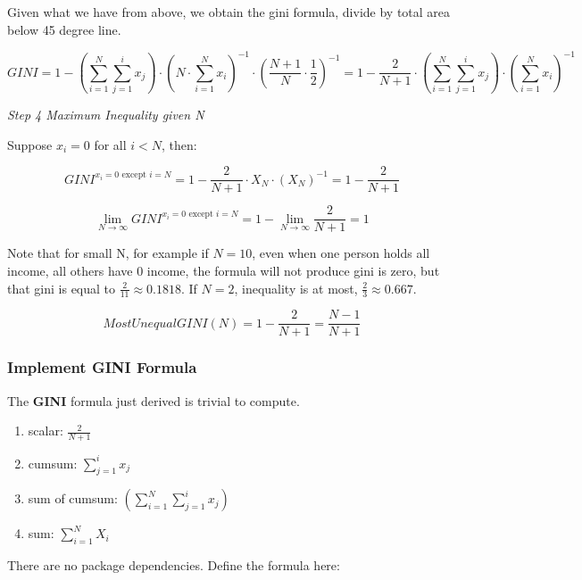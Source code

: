 \documentclass[
]{book}
\providecommand{\tightlist}{%
  \setlength{\itemsep}{0pt}\setlength{\parskip}{0pt}}
\begin{document}
Given what we have from above, we obtain the gini formula, divide by total area below 45 degree line.

\[
 GINI =
  1 -
  \left(\sum_{i=1}^N \sum_{j=1}^{i} x_j\right)
  \cdot
  \left(
    N \cdot \sum_{i=1}^N x_i
  \right)^{-1}
  \cdot
  \left( \frac{N+1}{N}\cdot\frac{1}{2} \right)^{-1}
  =
  1 - \frac{2}{N+1}
  \cdot
  \left(\sum_{i=1}^N \sum_{j=1}^{i} x_j\right)
  \cdot
  \left(
    \sum_{i=1}^N x_i
  \right)^{-1}
\]

\emph{Step 4 Maximum Inequality given N}

Suppose \(x_i=0\) for all \(i<N\), then:

\[
 GINI^{x_i = 0 \text{ except } i=N}
 =
  1 - \frac{2}{N+1}
  \cdot
  X_N
  \cdot
  \left(
    X_N
  \right)^{-1}
 =
 1 - \frac{2}{N+1}
\]

\[
 \lim_{N \rightarrow \infty} GINI^{x_i = 0 \text{ except } i=N}
 =
 1 -
 \lim_{N \rightarrow \infty}
 \frac{2}{N+1}
 = 1
\]

Note that for small N, for example if \(N=10\), even when one person holds all income, all others have 0 income, the formula will not produce gini is zero, but that gini is equal to \(\frac{2}{11}\approx 0.1818\). If \(N=2\), inequality is at most, \(\frac{2}{3}\approx 0.667\).

\[
 MostUnequalGINI\left(N\right) = 1 - \frac{2}{N+1} = \frac{N-1}{N+1}
\]

\hypertarget{implement-gini-formula}{%
\subsubsection{Implement GINI Formula}\label{implement-gini-formula}}

The \textbf{GINI} formula just derived is trivial to compute.

\begin{enumerate}
\def\labelenumi{\arabic{enumi}.}
\tightlist
\item
  scalar: \(\frac{2}{N+1}\)
\item
  cumsum: \(\sum_{j=1}^{i} x_j\)
\item
  sum of cumsum: \(\left(\sum_{i=1}^N \sum_{j=1}^{i} x_j\right)\)
\item
  sum: \(\sum_{i=1}^N X_i\)
\end{enumerate}

There are no package dependencies. Define the formula here:
\end{document}
